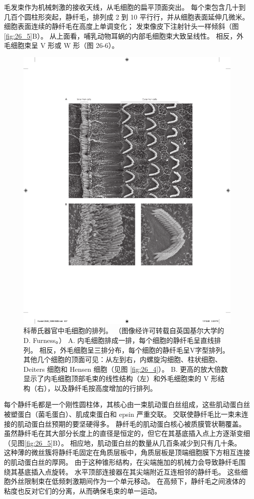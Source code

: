 毛发束作为机械刺激的接收天线，从毛细胞的扁平顶面突出。 
每个束包含几十到几百个圆柱形突起，静纤毛，排列成 2 到 10 平行行，并从细胞表面延伸几微米。 
细胞表面连续的静纤毛在高度上单调变化； 发束像皮下注射针头一样倾斜（图\ref{fig:26_5}B）。 
从上面看，哺乳动物耳蜗的内部毛细胞束大致呈线性。 
相反，外毛细胞束呈 V 形或 W 形（图 26-6）。

\begin{figure}[htbp]
	\centering
	\includegraphics[width=0.5\linewidth]{chap26/fig_26_6}
	\caption{科蒂氏器官中毛细胞的排列。
		（图像经许可转载自英国基尔大学的 D. Furness。） 
		A. 内毛细胞排成一排，每个细胞的静纤毛呈直线排列。 
		相反，外毛细胞呈三排分布，每个细胞的静纤毛呈V字型排列。 
		其他几个细胞的顶面可见：从左到右，内螺旋沟细胞、柱状细胞、Deiters 细胞和 Hensen 细胞（见图 \ref{fig:26_4}）。 
		B. 更高的放大倍数显示了内毛细胞顶部毛束的线性结构（左）和外毛细胞束的 V 形结构（右），以及静纤毛按高度增加的行排列。}
	\label{fig:26_6}
\end{figure}


每个静纤毛都是一个刚性圆柱体，其核心由一束肌动蛋白丝组成，这些肌动蛋白丝被塑蛋白（菌毛蛋白）、肌成束蛋白和 epsin 严重交联。 
交联使静纤毛比一束未连接的肌动蛋白丝预期的要坚硬得多。 
静纤毛的肌动蛋白核心被质膜管状鞘覆盖。 
虽然静纤毛在其大部分长度上的直径是恒定的，但它在其基底插入点上方逐渐变细（见图\ref{fig:26_5}B）。 
相应地，肌动蛋白丝的数量从几百条减少到只有几十条。 
这种薄的微丝簇将静纤毛固定在角质层板中，角质层板是顶端细胞膜下方相互连接的肌动蛋白丝的厚网。 
由于这种锥形结构，在尖端施加的机械力会导致静纤毛围绕其基底插入点旋转。 
水平顶部连接器在其尖端附近互连相邻的静纤毛。 
这些细胞外丝限制束在低频刺激期间作为一个单元移动。 
在高频下，静纤毛之间液体的粘度也反对它们的分离，从而确保毛束的单一运动。


